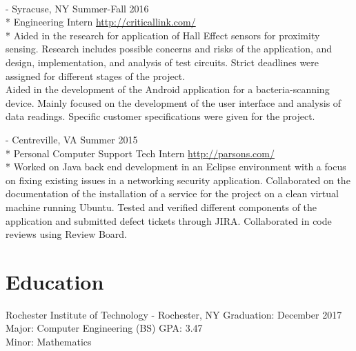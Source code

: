\documentclass[a4paper,margin,line]{resume}
\newcommand{\rurl}[1]{\hfill {\footnotesize \url{#1}}}
\newcommand{\rdate}[1]{\hfill {\small #1}}
\renewcommand{\employer}[5]{ \item[#1] - #2 \rdate{#3} \\* #4 \rurl{#5} \\*}
\begin{document}
\begin{resume}
\begin{asparadesc}
        \\
        \employer{Critical Link LLC}{Syracuse, NY}{Summer-Fall 2016}{Engineering Intern}
        {http://criticallink.com/}
        \small
        Aided in the research for application of Hall Effect sensors for proximity sensing. 
        Research includes possible concerns and risks of the application, and design, implementation, and analysis of 
        test circuits. Strict deadlines were assigned for different stages of the project.\smallskip\\
        Aided in the development of the Android application for a bacteria-scanning device. Mainly focused on the development of the user 
        interface and analysis of data readings. Specific customer specifications were given for the project. 
        \\
        \employer{Parsons Government Services}{Centreville, VA}{Summer 2015}{Personal Computer Support Tech Intern}
        {http://parsons.com/}
        \small
        Worked on Java back end development in an Eclipse environment with a focus on fixing existing 
        issues in a networking security application. Collaborated on the documentation of the installation 
        of a service for the project on a clean virtual machine running Ubuntu. Tested and verified 
        different components of the application and submitted defect tickets through JIRA. Collaborated 
        in code reviews using Review Board.
        \normalsize
        
    \end{asparadesc}


\section{\mysidestyle Education}
    \begin{compactdesc}
        \item[Rochester Institute of Technology] - Rochester, NY \rdate{Graduation: December 2017} \\
            Major: Computer Engineering (BS) \rdate{GPA: 3.47}\\
            Minor: Mathematics
    \end{compactdesc}



\end{resume}
\end{document}
